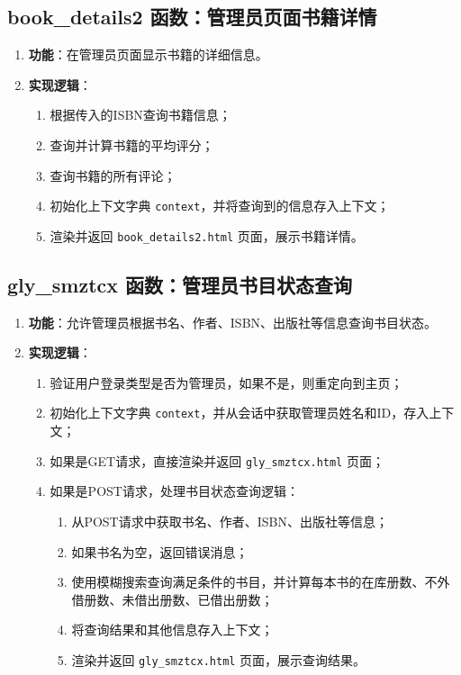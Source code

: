 \documentclass{ctexart}
\begin{document}
\subsection{book\_details2 函数：管理员页面书籍详情}
\begin{enumerate}
    \item \textbf{功能}：在管理员页面显示书籍的详细信息。
    \item \textbf{实现逻辑}：
    \begin{enumerate}
        \item 根据传入的ISBN查询书籍信息；
        \item 查询并计算书籍的平均评分；
        \item 查询书籍的所有评论；
        \item 初始化上下文字典 \texttt{context}，并将查询到的信息存入上下文；
        \item 渲染并返回 \texttt{book\_details2.html} 页面，展示书籍详情。
    \end{enumerate}
\end{enumerate}

\subsection{gly\_smztcx 函数：管理员书目状态查询}
\begin{enumerate}
    \item \textbf{功能}：允许管理员根据书名、作者、ISBN、出版社等信息查询书目状态。
    \item \textbf{实现逻辑}：
    \begin{enumerate}
        \item 验证用户登录类型是否为管理员，如果不是，则重定向到主页；
        \item 初始化上下文字典 \texttt{context}，并从会话中获取管理员姓名和ID，存入上下文；
        \item 如果是GET请求，直接渲染并返回 \texttt{gly\_smztcx.html} 页面；
        \item 如果是POST请求，处理书目状态查询逻辑：
        \begin{enumerate}
            \item 从POST请求中获取书名、作者、ISBN、出版社等信息；
            \item 如果书名为空，返回错误消息；
            \item 使用模糊搜索查询满足条件的书目，并计算每本书的在库册数、不外借册数、未借出册数、已借出册数；
            \item 将查询结果和其他信息存入上下文；
            \item 渲染并返回 \texttt{gly\_smztcx.html} 页面，展示查询结果。
        \end{enumerate}
    \end{enumerate}
\end{enumerate}
\end{document}
